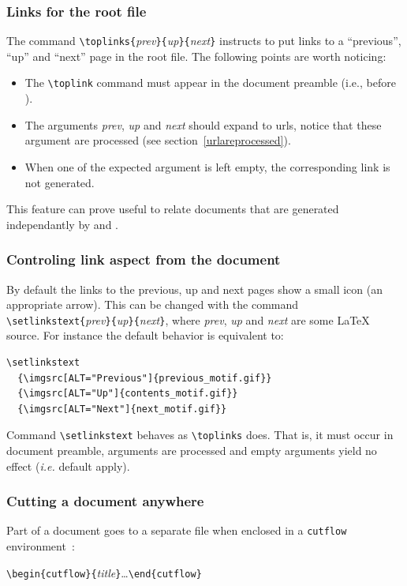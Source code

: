 \subsubsection{Links for the root file}
The command \verb+\toplinks{+\textit{prev}\verb+}{+\textit{up}\verb+}{+\textit{next}\verb+}+ instructs \hacha{}  to put links to a
``previous'', ``up'' and ``next'' page in the root file.
The following points are worth noticing:
\begin{itemize}
\item The \verb+\toplink+ command must appear in the document preamble
(i.e., before \verb++).
\item The arguments
\textit{prev}, \textit{up} and \textit{next} should expand to urls,
notice that these argument are processed (see section~\ref{urlareprocessed}).
\item When one of the expected argument is left empty,
the corresponding link is not generated.
\end{itemize}
This feature can prove useful to
relate documents that are generated independantly by
\hevea{} and \hacha{}.

\subsubsection{Controling link aspect from the document}
%
By default the links to the previous, up and next pages show a small
icon (an appropriate arrow). This can be changed with the command
\verb+\setlinkstext{+\textit{prev}\verb+}{+\textit{up}\verb+}{+\textit{next}\verb+}+,
where \textit{prev}, \textit{up} and \textit{next} are some \LaTeX{}
source.
For instance the default behavior is equivalent to:
\begin{verbatim}
\setlinkstext
  {\imgsrc[ALT="Previous"]{previous_motif.gif}}
  {\imgsrc[ALT="Up"]{contents_motif.gif}}
  {\imgsrc[ALT="Next"]{next_motif.gif}}
\end{verbatim}
Command \verb+\setlinkstext+ behaves as \verb+\toplinks+ does.
That is, it must occur in document preamble, arguments are processed
and empty arguments yield no effect (\emph{i.e.} default apply).

\subsubsection{Cutting a document anywhere}
Part of a document goes to a separate file when enclosed in a
\verb+cutflow+ environment~:
\begin{flushleft}
  \verb+\begin{cutflow}{+\textit{title}\verb+}+\ldots\verb+\end{cutflow}+
\end{flushleft}


